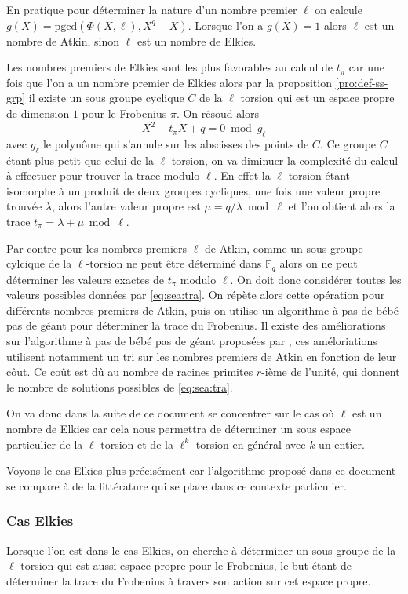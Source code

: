 \documentclass[10pt,a4paper]{book}
\theoremstyle{plain}
\theoremstyle{definition}
\theoremstyle{definition}
\theoremstyle{definition}
\theoremstyle{definition}
\theoremstyle{remark}
\theoremstyle{remark}
\theoremstyle{definition}
\begin{document}
En pratique pour déterminer la nature d'un nombre premier $\ell$ on calcule $g(X)=\mathrm{pgcd}(\Phi(X,\ell),X^q-X)$. Lorsque l'on a $g(X)=1$  alors $\ell$ est un nombre de Atkin, sinon $\ell$ est un nombre de Elkies.

Les nombres premiers de Elkies sont les plus favorables au calcul de $t_{\pi}$ car une fois que l'on a un nombre premier de Elkies alors par la proposition \ref{pro:def-ss-grp} il existe un sous groupe cyclique $C$ de la $\ell$ torsion qui est un espace propre de dimension $1$ pour le Frobenius $\pi$. On résoud alors 
\begin{equation*}
X^2-t_{\pi}X+q = 0 \bmod g_{\ell}
\end{equation*} 
avec $g_{\ell}$ le polynôme qui s'annule sur les abscisses des points de $C$.
Ce groupe $C$ étant plus petit que celui de la $\ell$-torsion, on va diminuer la complexité du calcul à effectuer pour trouver la trace modulo $\ell$. En effet la $\ell$-torsion étant isomorphe à un produit de deux groupes cycliques, une fois une valeur propre trouvée $\lambda$, alors l'autre valeur propre est $\mu=q/\lambda \bmod \ell$ et l'on obtient alors la trace $t_{\pi}=\lambda+\mu \bmod \ell$. 

Par contre pour les nombres premiers $\ell$ de Atkin, comme un sous groupe cylcique de la $\ell$-torsion ne peut être déterminé dans $\mathbb{F}_q$ alors on ne peut déterminer les valeurs exactes de $t_{\pi}$ modulo $\ell$. On doit donc considérer toutes les valeurs possibles données par \eqref{eq:sea:tra}. On répète alors cette opération pour  différents nombres premiers de Atkin, puis on utilise un algorithme à pas de bébé pas de géant pour déterminer la trace du Frobenius. Il existe des améliorations sur l'algorithme à pas de bébé pas de géant proposées par \cite{Ler97a}, ces améloriations utilisent notamment un tri sur les nombres premiers de Atkin en fonction de leur côut. Ce coût est dû au nombre de racines primites $r$-ième de l'unité, qui donnent le nombre de solutions possibles de \eqref{eq:sea:tra}.


On va donc dans la suite de ce document se concentrer sur le cas où $\ell$ est un nombre de Elkies car cela nous permettra de déterminer un sous espace particulier de la $\ell$-torsion et de la $\ell^k$ torsion en général avec $k$ un entier.

Voyons le cas Elkies plus précisément car l'algorithme proposé dans ce document se compare à de la littérature qui se place dans ce contexte particulier.

\subsubsection{Cas Elkies} \label{sub:Elkies}
Lorsque l'on est dans le cas Elkies, on cherche à déterminer un sous-groupe de la $\ell$-torsion qui est aussi espace propre pour le Frobenius, le but étant de déterminer la trace du Frobenius à travers son action sur cet espace propre. 
\end{document}
